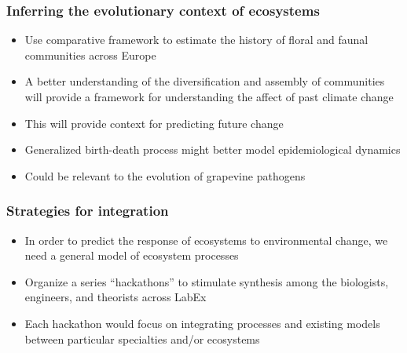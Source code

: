 \begin{frame}
    \frametitle{Inferring the evolutionary context of ecosystems}
    \begin{itemize}[<+->]
        \item Use comparative framework to estimate the history of floral and
            faunal communities across Europe
        \item A better understanding of the diversification and assembly
            of communities will provide a framework for understanding
            the affect of past climate change
        \item This will provide context for predicting future change
    \end{itemize}
\end{frame}

\begin{frame}
    \begin{itemize}[<+->]
        \item Generalized birth-death process might better model
            epidemiological dynamics
        \item Could be relevant to the evolution of grapevine pathogens
    \end{itemize}
\end{frame}


\begin{frame}
    \frametitle{Strategies for integration}
    \begin{itemize}[<+->]
        \item In order to predict the response of ecosystems to environmental
            change, we need a general model of ecosystem processes
        \item Organize a series ``hackathons'' to stimulate synthesis among the
            biologists, engineers, and theorists across LabEx 
        \item Each hackathon would focus on integrating processes and existing
            models between particular specialties and/or ecosystems
    \end{itemize}
\end{frame}





